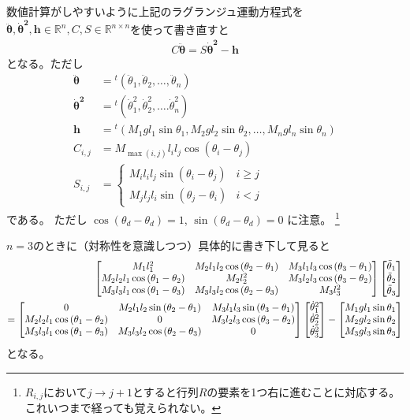 \documentclass{jsarticle}
\newcommand{\eqa}[1]{\begin{align}#1\end{align}}
\newcommand{\cost}[2]{\cos\left(\theta_{#1}-\theta_{#2}\right)}
\newcommand{\sint}[2]{\sin\left(\theta_{#1}-\theta_{#2}\right)}
\newcommand{\dott}[1]{\dot{\theta}_{#1}}
\newcommand{\ddott}[1]{\ddot{\theta}_{#1}}
\begin{document}
数値計算がしやすいように上記のラグランジュ運動方程式を$\bm{\ddot{\theta}}, \bm{\dot{\theta}^2}, \bm{h} \in \mathbb{R}^n, C, S \in \mathbb{R}^{n\times n}$を使って書き直すと
\eqa{
	C \bm{\ddot{\theta}} = S \bm{\dot{\theta}^2} - \bm{h}
}
となる。ただし
\eqa{
	\bm{\ddot{\theta}} &= {}^t(\ddott{1}, \ddott{2}, \dots, \ddott{n}) \\
	\bm{\dot{\theta}^2} &= {}^t(\dott{1}^2, \dott{2}^2, \dots. \dott{n}^2) \\
	\bm{h} &= {}^t(M_1 g l_1 \sin\theta_1, M_2 g l_2 \sin\theta_2, \dots, M_n g l_n \sin\theta_n) \\
	C_{i,j} &= M_{\max(i, j)} l_i l_j \cost{i}{j} \\
	S_{i,j} &= \begin{cases}
		M_i l_i l_j \sint{i}{j} & \text{$i \ge j$}\\
		M_j l_j l_i \sint{j}{i} & \text{$i < j$}
	\end{cases}
}
である。
ただし $\cost{d}{d} = 1$, $\sint{d}{d} = 0$ に注意。
\footnote{$R_{i,j}$において$j\rightarrow j+1$とすると行列$R$の要素を1つ右に進むことに対応する。これいつまで経っても覚えられない。}

$n=3$のときに（対称性を意識しつつ）具体的に書き下して見ると
\eqa{
	\begin{bmatrix}
		M_1 l_1^2 & M_2 l_1 l_2 \cost{2}{1} & M_3 l_1 l_3 \cost{3}{1} \\
		M_2 l_2 l_1 \cost{1}{2} & M_2 l_2^2 & M_3 l_2 l_3 \cost{3}{2} \\
		M_3 l_3 l_1 \cost{1}{3} & M_3 l_3 l_2 \cost{2}{3} & M_3 l_3^2
	\end{bmatrix}
	\begin{bmatrix}
		\ddott{1} \\ \ddott{2} \\ \ddott{3}
	\end{bmatrix} \notag\\
	=
	\begin{bmatrix}
		0 & M_2 l_1 l_2 \sint{2}{1} & M_3 l_1 l_3 \sint{3}{1} \\
		M_2 l_2 l_1 \cost{1}{2} & 0 & M_3 l_2 l_3 \cost{3}{2} \\
		M_3 l_3 l_1 \cost{1}{3} & M_3 l_3 l_2 \cost{2}{3} & 0
	\end{bmatrix}
	\begin{bmatrix}
		\dott{1}^2 \\ \dott{2}^2 \\ \dott{3}^2
	\end{bmatrix}
	-
	\begin{bmatrix}
		M_1 g l_1 \sin\theta_1 \\ M_2 g l_2 \sin\theta_2 \\ M_3 g l_3 \sin\theta_3
	\end{bmatrix}
}
となる。
\end{document}
